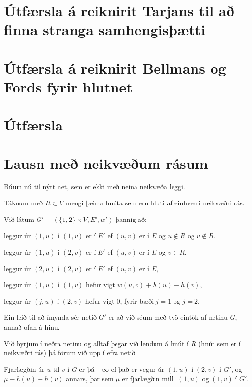 \section{Útfærsla á reiknirit Tarjans til að finna stranga samhengisþætti}
{
}

\section{Útfærsla á reiknirit Bellmans og Fords fyrir hlutnet}
{
}

\section{Útfærsla}
{
}

\section{Lausn með neikvæðum rásum}
{
    {
        \item<1-> Búum nú til nýtt net, sem er ekki með neina neikvæða leggi.
        \item<2-> Táknum með $R \subset V$ mengi þeirra hnúta sem eru hluti af einhverri neikvæðri rás.
        \item<3-> Við látum $G' = (\{1, 2\} \times V, E', w')$ þannig að:
        {
            \item<4-> leggur úr $(1, u)$ í $(1, v)$ er í $E'$ ef $(u, v)$ er í $E$ og $u \not \in R$ og $v \not \in R$.
            \item<5-> leggur úr $(1, u)$ í $(2, v)$ er í $E'$ ef $(u, v)$ er í $E$ og $v \in R$.
            \item<6-> leggur úr $(2, u)$ í $(2, v)$ er í $E'$ ef $(u, v)$ er í $E$,
            \item<7-> leggur úr $(1, u)$ í $(1, v)$ hefur vigt $w(u, v) + h(u) - h(v)$,
            \item<8-> leggur úr $(j, u)$ í $(2, v)$ hefur vigt $0$, fyrir bæði $j = 1$ og $j = 2$.
        }
        \item<9-> Ein leið til að ímynda sér netið $G'$ er að við séum með tvö eintök af netinu $G$, annað ofan á hinu.
        \item<10-> Við byrjum í neðra netinu og alltaf þegar við lendum á hnút í $R$ (hnút sem er í neikvæðri rás) þá förum við upp í efra netið.
        \item<11-> Fjarlægðin úr $u$ til $v$ í $G$ er þá $-\infty$ ef það er vegur úr $(1, u)$ í $(2, v)$ í $G'$,
                    og $\mu - h(u) + h(v)$ annars, þar sem $\mu$ er fjarlægðin milli $(1, u)$ og $(1, v)$ í $G'$.
    }
}

